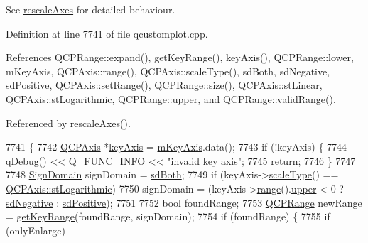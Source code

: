 See \hyperlink{class_q_c_p_abstract_plottable_a7e8fc3be43c27ccacd70a7bf9d74a5cd}{rescale\+Axes} for detailed behaviour. 

Definition at line 7741 of file qcustomplot.\+cpp.



References Q\+C\+P\+Range\+::expand(), get\+Key\+Range(), key\+Axis(), Q\+C\+P\+Range\+::lower, m\+Key\+Axis, Q\+C\+P\+Axis\+::range(), Q\+C\+P\+Axis\+::scale\+Type(), sd\+Both, sd\+Negative, sd\+Positive, Q\+C\+P\+Axis\+::set\+Range(), Q\+C\+P\+Range\+::size(), Q\+C\+P\+Axis\+::st\+Linear, Q\+C\+P\+Axis\+::st\+Logarithmic, Q\+C\+P\+Range\+::upper, and Q\+C\+P\+Range\+::valid\+Range().



Referenced by rescale\+Axes().


\begin{DoxyCode}
7741                                                                 \{
7742   \hyperlink{class_q_c_p_axis}{QCPAxis} *\hyperlink{class_q_c_p_abstract_plottable_a72c7a09c22963f2c943f07112b311103}{keyAxis} = \hyperlink{class_q_c_p_abstract_plottable_a426f42e254d0f8ce5436a868c61a6827}{mKeyAxis}.data();
7743   \textcolor{keywordflow}{if} (!keyAxis) \{
7744     qDebug() << Q\_FUNC\_INFO << \textcolor{stringliteral}{"invalid key axis"};
7745     \textcolor{keywordflow}{return};
7746   \}
7747 
7748   \hyperlink{class_q_c_p_abstract_plottable_a661743478a1d3c09d28ec2711d7653d8}{SignDomain} signDomain = \hyperlink{class_q_c_p_abstract_plottable_a661743478a1d3c09d28ec2711d7653d8a082b98cfb91a7363a3b5cd17b0c1cd60}{sdBoth};
7749   \textcolor{keywordflow}{if} (keyAxis->\hyperlink{class_q_c_p_axis_a8563e13407bc0616da7f7c84e02de170}{scaleType}() == \hyperlink{class_q_c_p_axis_a36d8e8658dbaa179bf2aeb973db2d6f0abf5b785ad976618816dc6f79b73216d4}{QCPAxis::stLogarithmic})
7750     signDomain = (keyAxis->\hyperlink{class_q_c_p_axis_ab1ea79a4f5ea4cf42620f8f51c477ac4}{range}().\hyperlink{class_q_c_p_range_ae44eb3aafe1d0e2ed34b499b6d2e074f}{upper} < 0 ? \hyperlink{class_q_c_p_abstract_plottable_a661743478a1d3c09d28ec2711d7653d8a0fc9a70796ef60ad18ddd18056e6dc63}{sdNegative} : 
      \hyperlink{class_q_c_p_abstract_plottable_a661743478a1d3c09d28ec2711d7653d8a02951859f243a4d24e779cfbb5471030}{sdPositive});
7751 
7752   \textcolor{keywordtype}{bool} foundRange;
7753   \hyperlink{class_q_c_p_range}{QCPRange} newRange = \hyperlink{class_q_c_p_abstract_plottable_a345d702b2e7e12c8cfdddff65ba85e8c}{getKeyRange}(foundRange, signDomain);
7754   \textcolor{keywordflow}{if} (foundRange) \{
7755     \textcolor{keywordflow}{if} (onlyEnlarge)

\end{DoxyCode}
